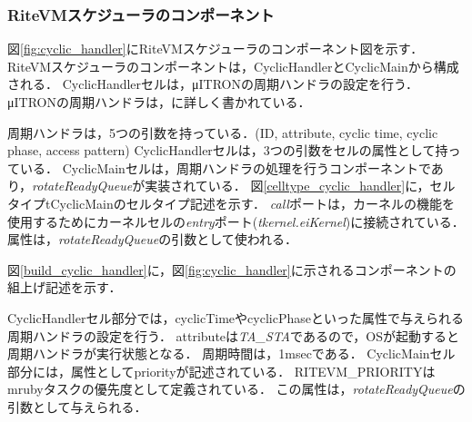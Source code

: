 \documentclass[submit]{ipsj_v2/UTF8/ipsj}
\begin{document}
\subsubsection{RiteVMスケジューラのコンポーネント}
図\ref{fig:cyclic_handler}にRiteVMスケジューラのコンポーネント図を示す．
RiteVMスケジューラのコンポーネントは，CyclicHandlerとCyclicMainから構成される．
CyclicHandlerセルは，μITRONの周期ハンドラの設定を行う．
μITRONの周期ハンドラは，\cite{par:microITRON}に詳しく書かれている．

周期ハンドラは，5つの引数を持っている．(ID, attribute, cyclic time, cyclic phase, access pattern)
CyclicHandlerセルは，3つの引数をセルの属性として持っている．
CyclicMainセルは，周期ハンドラの処理を行うコンポーネントであり，{\it rotateReadyQueue}が実装されている．
図\ref{celltype_cyclic_handler}に，セルタイプtCyclicMainのセルタイプ記述を示す．
{\it call}ポートは，カーネルの機能を使用するためにカーネルセルの{\it entry}ポート({\it tkernel.eiKernel})に接続されている．
属性は，{\it rotateReadyQueue}の引数として使われる．

図\ref{build_cyclic_handler}に，図\ref{fig:cyclic_handler}に示されるコンポーネントの組上げ記述を示す．

CyclicHandlerセル部分では，cyclicTimeやcyclicPhaseといった属性で与えられる周期ハンドラの設定を行う．
attributeは{\it TA\_STA}であるので，OSが起動すると周期ハンドラが実行状態となる．
周期時間は，1msecである．
CyclicMainセル部分には，属性としてpriorityが記述されている．
RITEVM\_PRIORITYはmrubyタスクの優先度として定義されている．
この属性は，{\it rotateReadyQueue}の引数として与えられる．
\end{document}
